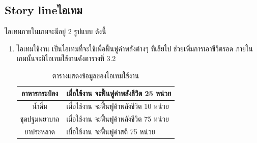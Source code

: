\subsection{\ifenglish Story line\else ไอเทม\fi }
ไอเทมภายในเกมจะมีอยู่ 2 รูปแบบ ดังนี้
\begin{enumerate}
    \item ไอเทมใช้งาน เป็นไอเทมที่จะใช้เพื่อฟื้นฟูค่าพลังต่างๆ ที่เสียไป ช่วยเพิ่มการเอาชีวิตรอด ภายในเกมนั้นจะมีไอเทมใช้งานดังตารางที่ 3.2
    \begin{table}[h]
        \centering
        \begin{tabular}{|c|p{8cm}|}
            \hline
            อาหารกระป๋อง & เมื่อใช้งาน จะฟื้นฟูค่าพลังชีวิต 25 หน่วย \\
            \hline
            น้ำดื่ม         & เมื่อใช้งาน จะฟื้นฟูค้าพลังชีวิต 10 หน่วย \\
            \hline
            ชุดปฐมพยาบาล & เมื่อใช้งาน จะฟื้นฟูค้าพลังชีวิต 75 หน่วย \\
            \hline
            ยาประหลาด   & เมื่อใช้งาน จะฟื้นฟูค่าสติ 75 หน่วย     \\
            \hline
        \end{tabular}
        \caption[ตารางแสดงข้อมูลของไอเทมใช้งาน]{ตารางแสดงข้อมูลของไอเทมใช้งาน}
    \end{table}


\end{enumerate}
